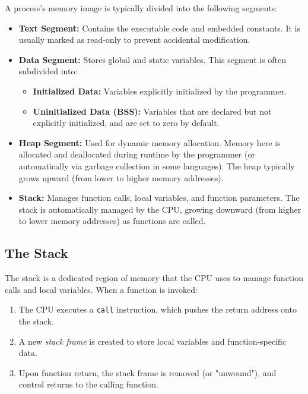 \begin{definition}
A process's memory image is typically divided into the following segments:
\begin{itemize}
    \item \textbf{Text Segment:} Contains the executable code and embedded constants. It is usually marked as read-only to prevent accidental modification.
    \item \textbf{Data Segment:} Stores global and static variables. This segment is often subdivided into:
        \begin{itemize}
            \item \textbf{Initialized Data:} Variables explicitly initialized by the programmer.
            \item \textbf{Uninitialized Data (BSS):} Variables that are declared but not explicitly initialized, and are set to zero by default.
        \end{itemize}
    \item \textbf{Heap Segment:} Used for dynamic memory allocation. Memory here is allocated and deallocated during runtime by the programmer (or automatically via garbage collection in some languages). The heap typically grows upward (from lower to higher memory addresses).
    \item \textbf{Stack:} Manages function calls, local variables, and function parameters. The stack is automatically managed by the CPU, growing downward (from higher to lower memory addresses) as functions are called.
\end{itemize}
\end{definition}

\subsection{The Stack}

The stack is a dedicated region of memory that the CPU uses to manage function calls and local variables. When a function is invoked:
\begin{enumerate}
    \item The CPU executes a \texttt{call} instruction, which pushes the return address onto the stack.
    \item A new \emph{stack frame} is created to store local variables and function-specific data.
    \item Upon function return, the stack frame is removed (or "unwound"), and control returns to the calling function.
\end{enumerate}


